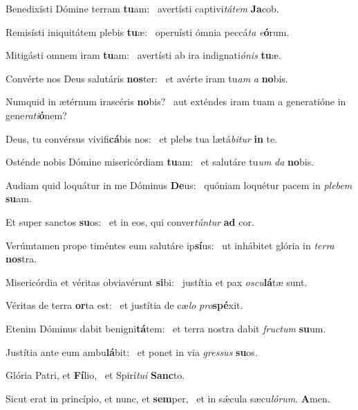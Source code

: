 \item Benedixísti Dómine terram \textbf{tu}am:~\psstar{} avertísti captivi\textit{tátem} \textbf{Ja}cob.
\item Remisísti iniquitátem plebis \textbf{tu}æ:~\psstar{} operuísti ómnia peccá\textit{ta} \textit{e}\textbf{ó}rum.
\item Mitigásti omnem iram \textbf{tu}am:~\psstar{} avertísti ab ira indignati\textit{ónis} \textbf{tu}æ.
\item Convérte nos Deus salutáris \textbf{nos}ter:~\psstar{} et avérte iram tu\textit{am} \textit{a} \textbf{no}bis.
\item Numquid in ætérnum irascéris \textbf{no}bis?~\psstar{} aut exténdes iram tuam a generatióne in gene\textit{rati}\textbf{ó}nem?
\item Deus, tu convérsus vivifi\textbf{cá}bis nos:~\psstar{} et plebs tua lætá\textit{bitur} \textbf{in} te.
\item Osténde nobis Dómine misericórdiam \textbf{tu}am:~\psstar{} et salutáre tu\textit{um} \textit{da} \textbf{no}bis.
\item Audiam quid loquátur in me Dóminus \textbf{De}us:~\psstar{} quóniam loquétur pacem in \textit{plebem} \textbf{su}am.
\item Et super sanctos \textbf{su}os:~\psstar{} et in eos, qui conver\textit{túntur} \textbf{ad} cor.
\item Verúmtamen prope timéntes eum salutáre ip\textbf{sí}us:~\psstar{} ut inhábitet glória in \textit{terra} \textbf{nos}tra.
\item Misericórdia et véritas obviavérunt \textbf{si}bi:~\psstar{} justítia et pax \textit{oscu}\textbf{lá}tæ sunt.
\item Véritas de terra \textbf{or}ta est:~\psstar{} et justítia de cæ\textit{lo} \textit{pro}\textbf{spé}xit.
\item Etenim Dóminus dabit benigni\textbf{tá}tem:~\psstar{} et terra nostra dabit \textit{fructum} \textbf{su}um.
\item Justítia ante eum ambu\textbf{lá}bit:~\psstar{} et ponet in via \textit{gressus} \textbf{su}os.
\item Glória Patri, et \textbf{Fí}lio,~\psstar{} et Spirí\textit{tui} \textbf{Sanc}to.
\item Sicut erat in princípio, et nunc, et \textbf{sem}per,~\psstar{} et in sǽcula sæcu\textit{lórum}. \textbf{A}men.
